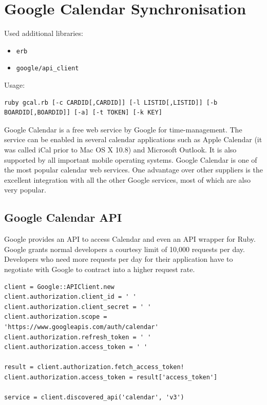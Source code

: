 \section{Google Calendar Synchronisation}
Used additional libraries:
\begin{itemize}
	\item \texttt{erb}
	\item \texttt{google/api\_client}
\end{itemize}

\vskip 3cm

Usage:
\begin{lstlisting}[aboveskip=1\baselineskip, style=bash, caption=\texttt{gcal.rb} usage., label=listing025]
ruby gcal.rb [-c CARDID[,CARDID]] [-l LISTID[,LISTID]] [-b BOARDID[,BOARDID]] [-a] [-t TOKEN] [-k KEY]
\end{lstlisting}

Google Calendar is a free web service by Google for time-management. The service can be enabled in several calendar applications such as Apple Calendar (it was called iCal prior to Mac OS X 10.8) and Microsoft Outlook. It is also supported by all important mobile operating systems. Google Calendar is one of the most popular calendar web services. One advantage over other suppliers is the excellent integration with all the other Google services, most of which are also very popular.

\subsection{Google Calendar API}
Google provides an API to access Calendar and even an API wrapper for Ruby. Google grants normal developers a courtesy limit of 10,000 requests per day. Developers who need more requests per day for their application have to negotiate with Google to contract into a higher request rate.

\begin{lstlisting}[aboveskip=1\baselineskip, caption=Initialisation of the Google Calendar API connection., label=listing017]
client = Google::APIClient.new
client.authorization.client_id = ' '
client.authorization.client_secret = ' '
client.authorization.scope = 'https://www.googleapis.com/auth/calendar'
client.authorization.refresh_token = ' '
client.authorization.access_token = ' '

result = client.authorization.fetch_access_token!
client.authorization.access_token = result['access_token']

service = client.discovered_api('calendar', 'v3')
\end{lstlisting}

